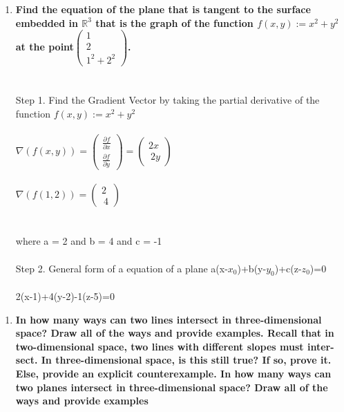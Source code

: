 \documentclass{article}
\begin{document}
\begin{enumerate}[8.]
\item\textbf{Find the equation of the plane that is tangent to the surface embedded
in $\mathbb{R}^{3}$ that is the graph of the function $f(x,y):= x^{2}+y^{2}$ at the point$\left(\!\begin{array}{c}1 \\ 2\\  1^{2}+2^{2}\end{array} \!\right)$.}\\
\\
\\
Step 1. Find the Gradient Vector by taking the partial derivative of the function $f(x,y):= x^{2}+y^{2}$\\
\\
$\nabla(f(x,y))= \left(\!\begin{array}{c}\frac{\partial f}{\partial x} \\\frac{\partial f}{\partial y}\end{array} \!\right)=\left(\!\begin{array}{c}2x \\\ 2y \end{array} \!\right)$\\
\\
$\nabla(f(1,2))=\left(\!\begin{array}{c}2 \\\ 4 \end{array} \!\right)$\\
\\
\\
where a = 2 and b = 4 and c = -1
\\
\\
Step 2. General form of a equation of a plane a(x-$x_{0}$)+b(y-$y_{0}$)+c(z-$z_{0}$)=0\\
\\
2(x-1)+4(y-2)-1(z-5)=0
\end{enumerate}
\begin{enumerate}[9.]
\item\textbf{In how many ways can two lines intersect in three-dimensional space? Draw
all of the ways and provide examples.
Recall that in two-dimensional space, two lines with different slopes must inter-
sect. In three-dimensional space, is this still true? If so, prove it. Else, provide
an explicit counterexample.
In how many ways can two planes intersect in three-dimensional space? Draw
all of the ways and provide examples}
\end{enumerate}
\end{document}
